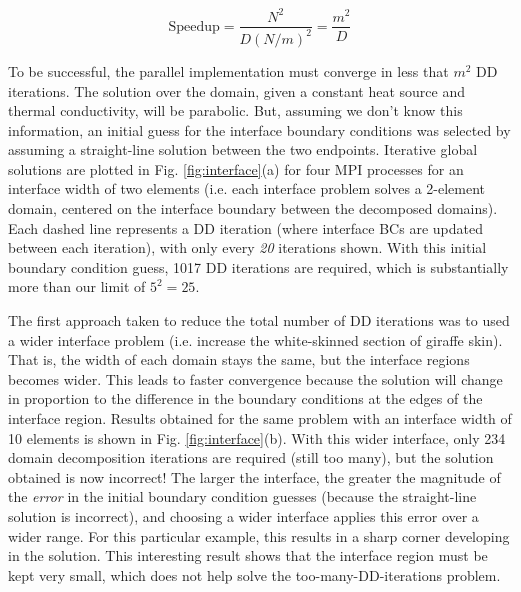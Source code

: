 \documentclass[10pt]{article}
\newcommand{\beq}{\begin{equation}}
\newcommand{\eeq}{\end{equation}}
\begin{document}
\beq
\textrm{Speedup}=\frac{N^2}{D(N/m)^2}=\frac{m^2}{D}
\eeq

To be successful, the parallel implementation must converge in less that \(m^2\) DD iterations. The solution over the domain, given a constant heat source and thermal conductivity, will be parabolic. But, assuming we don't know this information, an initial guess for the interface boundary conditions was selected by assuming a straight-line solution between the two endpoints. Iterative global solutions are plotted in Fig. \ref{fig:interface}(a) for four MPI processes for an interface width of two elements (i.e. each interface problem solves a 2-element domain, centered on the interface boundary between the decomposed domains). Each dashed line represents a DD iteration (where interface BCs are updated between each iteration), with only every {\it 20} iterations shown. With this initial boundary condition guess, 1017 DD iterations are required, which is substantially more than our limit of \(5^2=25\). 

The first approach taken to reduce the total number of DD iterations was to used a wider interface problem (i.e. increase the white-skinned section of giraffe skin). That is, the width of each domain stays the same, but the interface regions becomes wider. This leads to faster convergence because the solution will change in proportion to the difference in the boundary conditions at the edges of the interface region. Results obtained for the same problem with an interface width of 10 elements is shown in Fig. \ref{fig:interface}(b). With this wider interface, only 234 domain decomposition iterations are required (still too many), but the solution obtained is now incorrect! The larger the interface, the greater the magnitude of the {\it error} in the initial boundary condition guesses (because the straight-line solution is incorrect), and choosing a wider interface applies this error over a wider range. For this particular example, this results in a sharp corner developing in the solution. This interesting result shows that the interface region must be kept very small, which does not help solve the too-many-DD-iterations problem.
\end{document}

